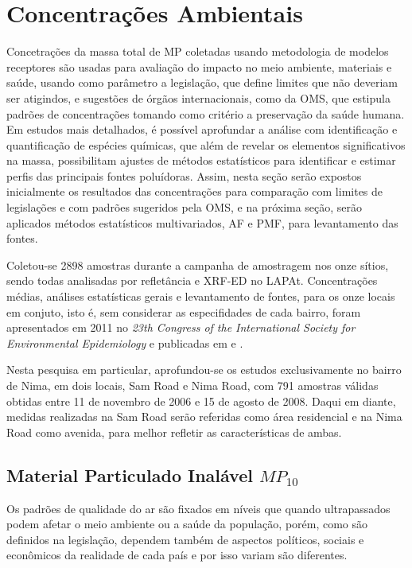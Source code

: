 \newpage
\section{Concentrações Ambientais}

Concetrações da massa total de MP coletadas usando metodologia de modelos 
receptores são usadas para avaliação do impacto no 
meio ambiente, materiais e saúde, usando como parâmetro a legislação, que
define limites que não deveriam ser atigindos, e sugestões de órgãos
internacionais, como da OMS, que estipula padrões de concentrações tomando como
critério a preservação da saúde humana. Em estudos mais detalhados, é possível 
aprofundar a análise com identificação e quantificação de espécies químicas, 
que além de revelar os elementos significativos na massa, possibilitam ajustes 
de métodos estatísticos para identificar e estimar perfis das principais 
fontes poluídoras. Assim, nesta seção serão expostos inicialmente os 
resultados das concentrações para comparação com limites de legislações e 
com padrões sugeridos pela OMS, e na próxima seção, serão aplicados métodos 
estatísticos multivariados, AF e PMF, para levantamento das fontes. 

Coletou-se 2898 amostras durante a campanha de amostragem nos onze sítios, sendo 
todas analisadas por refletância e XRF-ED no LAPAt. Concentrações médias, 
análises estatísticas gerais e levantamento de fontes, para os onze locais em 
conjuto, isto é, sem considerar as especifidades de cada bairro, foram 
apresentados em 2011 no \textit{23th Congress of the International Society 
for Environmental Epidemiology} \citep{zhou2011} e publicadas em 
\cite{zhou2013} e \cite{zhou2014}. 

Nesta pesquisa em particular, aprofundou-se os estudos exclusivamente no bairro
de Nima, em dois locais, Sam Road e Nima Road, com 791 amostras válidas obtidas
entre 11 de novembro de 2006 e 15 de agosto de 2008. Daqui em diante, 
medidas realizadas na Sam Road serão referidas como área residencial e na 
Nima Road como avenida, para melhor refletir as características de ambas.

\newpage
\subsection{Material Particulado Inalável $MP_{10}$}

Os padrões de qualidade do ar são fixados em níveis que quando 
ultrapassados podem afetar o meio ambiente ou a saúde da população, porém, 
como são definidos na legislação, dependem também de aspectos políticos, 
sociais e econômicos da realidade de cada país e por isso variam são diferentes.

